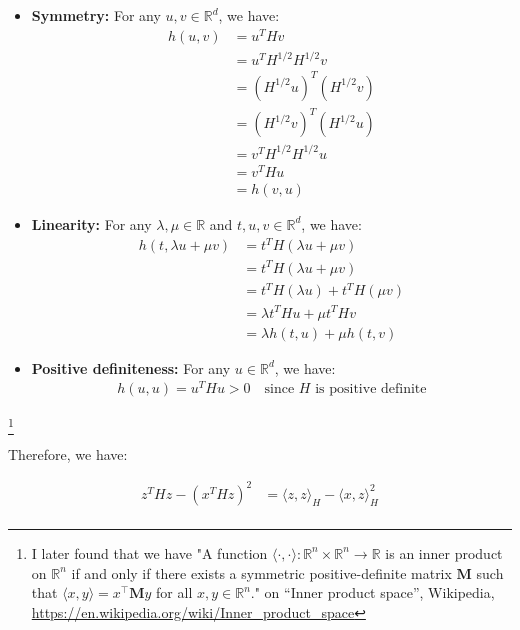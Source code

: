 \documentclass{article}
\begin{document}
\begin{itemize}
    \item \textbf{Symmetry:} For any $u, v \in \mathbb{R}^d$, we have:
    \begin{align*}
        h(u, v) 
        &= u^T H v \\
        &= u^T H^{1/2} H^{1/2} v \\
        &= (H^{1/2} u)^T (H^{1/2} v) \\
        &= (H^{1/2} v)^T (H^{1/2} u) \\
        &= v^T H^{1/2} H^{1/2} u \\
        &= v^T H u \\
        &= h(v, u)
    \end{align*}
    \item \textbf{Linearity:} For any $\lambda, \mu \in \mathbb{R}$ and $t, u, v \in \mathbb{R}^d$, we have:
    \begin{align*}
        h(t, \lambda u + \mu v) 
        &= t^T H (\lambda u + \mu v) \\
        &= t^T H (\lambda u + \mu v) \\
        &= t^T H (\lambda u) + t^T H (\mu v) \\
        &= \lambda t^T H u + \mu t^T H v \\
        &= \lambda h(t, u) + \mu h(t, v)
    \end{align*}
    \item \textbf{Positive definiteness:} For any $u \in \mathbb{R}^d$, we have:
    \begin{align*}
        h(u, u) = u^T H u > 0 \quad \text{since $H$ is positive definite}
    \end{align*}
\end{itemize}
\footnote{I later found that we have 
"A function $\langle \cdot, \cdot \rangle : \mathbb{R}^n \times \mathbb{R}^n \to \mathbb{R}$ 
is an inner product on $\mathbb{R}^n$ if and only if there exists a symmetric positive-definite matrix $\mathbf{M}$ 
such that $\langle x, y \rangle = x^\top \mathbf{M} y$ for all $x, y \in \mathbb{R}^n$."
on ``Inner product space'', Wikipedia, \url{https://en.wikipedia.org/wiki/Inner_product_space}}

Therefore, we have:

\begin{align*}
    z^T H z - (x^T H z)^2 
    &= \langle z, z \rangle_H - \langle x, z \rangle_H^2 \\
\end{align*}
\end{document}
